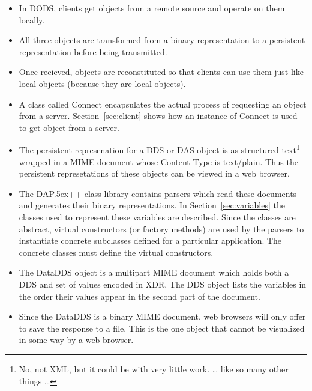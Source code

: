 \documentclass{article}
\newcommand{\dap}{\rm {\small DAP}\raise.5ex\hbox{\footnotesize ++}\xspace}
\begin{document}
\begin{itemize}
  
\item In DODS, clients get objects from a remote source and operate on them
  locally.
  
\item All three objects are transformed from a binary representation to a
  persistent representation before being transmitted.
  
\item Once recieved, objects are reconstituted so that clients can use them
  just like local objects (because they are local objects).
  
\item A class called Connect encapsulates the actual process of requesting an
  object from a server. Section~\ref{sec:client} shows how an instance of
  Connect is used to get object from a server.
  
\item The persistent represenation for a DDS or DAS object is as structured
  text\footnote{No, not XML, but it could be with very little work. \ldots
    like so many other things \ldots} wrapped in a MIME document whose
  Content-Type is text/plain. Thus the persistent represetations of these
  objects can be viewed in a web browser.
  
\item The \dap class library contains parsers which read these documents and
  generates their binary representations. In Section~\ref{sec:variables} the
  classes used to represent these variables are described. Since the classes
  are abstract, virtual constructors (or factory methods) are used by the
  parsers to instantiate concrete subclasses defined for a particular
  application. The concrete classes must define the virtual constructors.
  
\item The DataDDS object is a multipart MIME document which holds both a DDS
  and set of values encoded in XDR. The DDS object lists the variables
  in the order their values appear in the second part of the document.
  
\item Since the DataDDS is a binary MIME document, web browsers will only
  offer to save the response to a file. This is the one object that cannot be
  visualized in some way by a web browser.

\end{itemize}
\end{document}
